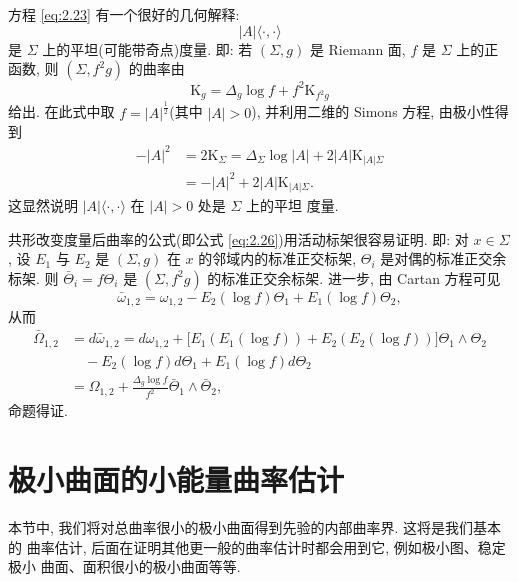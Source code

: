方程 \eqref{eq:2.23} 有一个很好的几何解释:
\begin{equation}
|A|\langle\cdot,\cdot\rangle
\label{eq:2.25}
\end{equation}
是 $\Sigma$ 上的平坦(可能带奇点)度量. 即: 若 $(\Sigma,g)$ 是 Riemann 面, $f$
是 $\Sigma$ 上的正函数, 则 $(\Sigma,f^{2}g)$ 的曲率由
\begin{equation}
\mathrm{K}_g=\Delta_g\log f+f^{2}\mathrm{K}_{f^{2}g}
\label{eq:2.26}
\end{equation}
给出. 在此式中取 $f=|A|^{\frac12}$(其中 $|A|>0$), 并利用二维的 Simons
方程, 由极小性得到
\begin{equation}
\begin{aligned}
-|A|^{2}&=2\mathrm{K}_{\Sigma}
 =\Delta_{\Sigma}\log|A|+2|A|\mathrm{K}_{|A|\Sigma}\\
&=-|A|^{2}+2|A|\mathrm{K}_{|A|\Sigma}.
\end{aligned}
\label{eq:2.27}
\end{equation}
这显然说明 $|A|\langle\cdot,\cdot\rangle$ 在 $|A|>0$ 处是 $\Sigma$ 上的平坦
度量.

共形改变度量后曲率的公式(即公式 \eqref{eq:2.26})用活动标架很容易证明. 即: 对
$x\in\Sigma$, 设 $E_1$ 与 $E_2$ 是 $(\Sigma,g)$ 在 $x$ 的邻域内的标准正交标架,
$\Theta_i$ 是对偶的标准正交余标架. 则 $\bar\Theta_i=f\Theta_i$ 是
$(\Sigma,f^{2}g)$ 的标准正交余标架. 进一步, 由 Cartan 方程可见
\begin{equation}
\bar\omega_{1,2}=\omega_{1,2}-E_2(\log f)\Theta_1+E_1(\log f)\Theta_2,
\label{eq:2.28}
\end{equation}
从而
\begin{equation}
\begin{aligned}
\bar\Omega_{1,2}&=d\bar\omega_{1,2}
 =d\omega_{1,2}+\bigl[E_1(E_1(\log f))+E_2(E_2(\log f))\bigr]
 \Theta_1\wedge\Theta_2\\
&\quad -E_2(\log f)d\Theta_1+E_1(\log f)d\Theta_2\\
&=\Omega_{1,2}+\frac{\Delta_g\log f}{f^{2}}\bar\Theta_1\wedge\bar\Theta_2,
\end{aligned}
\label{eq:2.29}
\end{equation}
命题得证.

\section{极小曲面的小能量曲率估计}
\label{sec:2.2}

本节中, 我们将对总曲率很小的极小曲面得到先验的内部曲率界. 这将是我们基本的
曲率估计, 后面在证明其他更一般的曲率估计时都会用到它, 例如极小图、稳定极小
曲面、面积很小的极小曲面等等.

